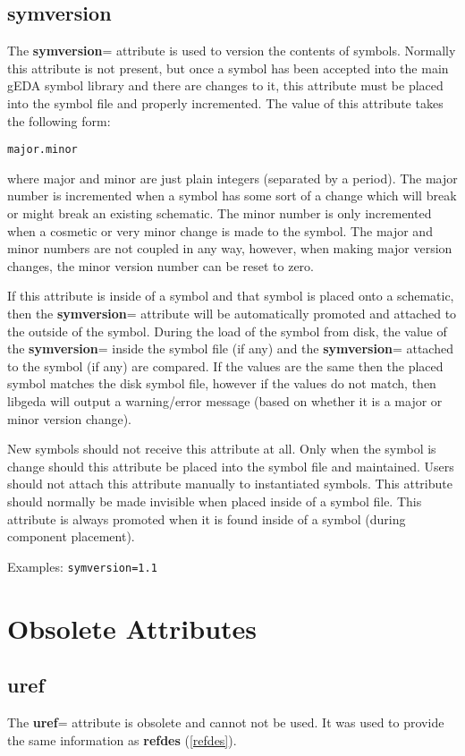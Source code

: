 \documentclass{article}
\begin{document}
\subsection{{\bf symversion}\label{symversion}}
The {\bf symversion}= attribute is used to version the contents of
symbols.  Normally this attribute is not present, but once a symbol has
been accepted into the main gEDA symbol library and there are changes
to it, this attribute must be placed into the symbol file and properly
incremented.  The value of this attribute takes the following form:

\texttt{major.minor}

where major and minor are just plain integers (separated by a period).
The major number is incremented when a symbol has some sort of a change
which will break or might break an existing schematic.  The minor number
is only incremented when a cosmetic or very minor change is made to
the symbol.  The major and minor numbers are not coupled in any way,
however, when making major version changes, the minor version number
can be reset to zero.

If this attribute is inside of a symbol and that symbol is placed onto
a schematic, then the {\bf symversion}= attribute will be automatically
promoted and attached to the outside of the symbol.  During the load
of the symbol from disk, the value of the {\bf symversion}= inside the
symbol file (if any) and the {\bf symversion}= attached to the symbol
(if any) are compared.  If the values are the same then the placed symbol
matches the disk symbol file, however if the values do not match, then
libgeda will output a warning/error message (based on whether it is a 
major or minor version change).

New symbols should not receive this attribute at all.  Only when the
symbol is change should this attribute be placed into the symbol file
and maintained.  Users should not attach this attribute manually to
instantiated symbols.  This attribute should normally be made invisible
when placed inside of a symbol file.  This attribute is always promoted
when it is found inside of a symbol (during component placement).

Examples: \texttt{symversion=1.1} 


\section{Obsolete Attributes}

\subsection{{\bf uref}\label{uref}}
The {\bf uref}= attribute is obsolete and cannot not be used.  It was used
to provide the same information as {\bf refdes} (\ref{refdes}).
\end{document}
